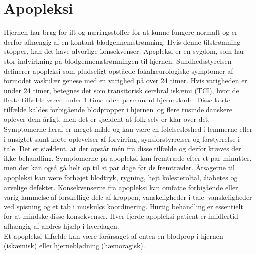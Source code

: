 \section{Apopleksi}
Hjernen har brug for ilt og næringsstoffer for at kunne fungere normalt og er derfor afhængig af en kontant blodgennemstrømning. Hvis denne tilstrømning stopper, kan det have alvorlige konsekvenser.\cite{Hjernesagen2015a} Apopleksi er en sygdom, som har stor indvirkning på blodgennemstrømningen til hjernen. Sundhedsstyrelsen definerer apopleksi som pludseligt opståede fokalneurologiske symptomer af formodet vaskulær genese med en varighed på over 24 timer.\cite{Sundhedsstyrelsen2009} Hvis varigheden er under 24 timer, betegnes det som transitorisk cerebral iskæmi (TCI), hvor de fleste tilfælde varer under 1 time uden permanent hjerneskade\cite{Sundhed.dk2014, Ritter2015}. Disse korte tilfælde kaldes forbigående blodpropper i hjernen, og flere tusinde danskere oplever dem årligt, men det er sjældent at folk selv er klar over det. Symptomerne heraf er meget milde og kan være en følelsesløshed i lemmerne eller i ansigtet samt korte oplevelser af forvirring, synsforstyrrelser og forstyrrelse i tale. Det er sjældent, at der opstår mén fra disse tilfælde og derfor kræves der ikke behandling.\cite{Hjernesagen2015a}\cite{Academic2015} 
Symptomerne på apopleksi kan fremtræde efter et par minutter, men der kan også gå helt op til et par dage før de fremtræder\cite{Kruuse2014, Academic2015}.
Årsagerne til apopleksi kan være forhøjet blodtryk, rygning, højt kolesteroltal, diabetes og arvelige defekter. Konsekvenserne fra apopleksi kan omfatte forbigående eller varig lammelse af forskellige dele af kroppen, %
vanskeligheder i tale, vanskeligheder ved spisning og et tab i muskuløs koordinering.\cite{Academic2015} Hurtig behandling er essentielt for at mindske disse konsekvenser. Hver fjerde apopleksi patient er imidlertid afhængig af andres hjælp i hverdagen.\cite{Hjernesagen2015a} \\ %
Et apopleksi tilfælde kan være forårsaget af enten en blodprop i hjernen (iskæmisk) eller hjerneblødning (hæmoragisk).\cite{Ritter2015} 

